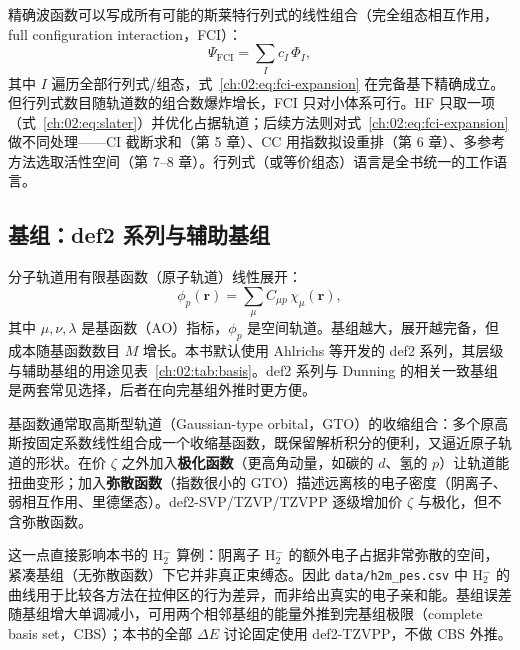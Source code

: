 精确波函数可以写成所有可能的斯莱特行列式的线性组合（完全组态相互作用，full configuration interaction，FCI）：
\begin{equation}
\Psi_{\mathrm{FCI}} = \sum_I c_I\,\Phi_I,
\label{ch:02:eq:fci-expansion}
\end{equation}
其中 $I$ 遍历全部行列式/组态，式~\eqref{ch:02:eq:fci-expansion} 在完备基下精确成立。但行列式数目随轨道数的组合数爆炸增长，FCI 只对小体系可行。HF 只取一项（式~\eqref{ch:02:eq:slater}）并优化占据轨道；后续方法则对式~\eqref{ch:02:eq:fci-expansion} 做不同处理——CI 截断求和（第 5 章）、CC 用指数拟设重排（第 6 章）、多参考方法选取活性空间（第 7--8 章）。行列式（或等价组态）语言是全书统一的工作语言。

\subsection{基组：def2 系列与辅助基组}
\label{ch:02:sec:basis}

分子轨道用有限基函数（原子轨道）线性展开\citep{szabo1996}：
\begin{equation}
\phi_p(\mathbf{r}) = \sum_\mu C_{\mu p}\,\chi_\mu(\mathbf{r}),
\label{ch:02:eq:basis-expansion}
\end{equation}
其中 $\mu,\nu,\lambda$ 是基函数（AO）指标，$\phi_p$ 是空间轨道。基组越大，展开越完备，但成本随基函数数目 $M$ 增长。本书默认使用 Ahlrichs 等开发的 def2 系列\citep{weigend2005def2}，其层级与辅助基组的用途见表~\ref{ch:02:tab:basis}。def2 系列与 Dunning 的相关一致基组\citep{dunning1989ccpvdz} 是两套常见选择，后者在向完基组外推时更方便。

基函数通常取高斯型轨道（Gaussian-type orbital，GTO）的收缩组合：多个原高斯按固定系数线性组合成一个收缩基函数，既保留解析积分的便利，又逼近原子轨道的形状。在价 $\zeta$ 之外加入\textbf{极化函数}（更高角动量，如碳的 $d$、氢的 $p$）让轨道能扭曲变形；加入\textbf{弥散函数}（指数很小的 GTO）描述远离核的电子密度（阴离子、弱相互作用、里德堡态）。def2-SVP/TZVP/TZVPP 逐级增加价 $\zeta$ 与极化，但不含弥散函数。

这一点直接影响本书的 H$_2^-$ 算例：阴离子 H$_2^-$ 的额外电子占据非常弥散的空间，紧凑基组（无弥散函数）下它并非真正束缚态。因此 \texttt{data/h2m\_pes.csv} 中 H$_2^-$ 的曲线用于比较各方法在拉伸区的行为差异，而非给出真实的电子亲和能。基组误差随基组增大单调减小，可用两个相邻基组的能量外推到完基组极限（complete basis set，CBS）；本书的全部 $\Delta E$ 讨论固定使用 def2-TZVPP，不做 CBS 外推。

